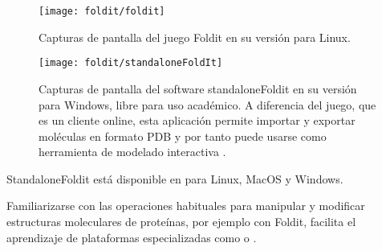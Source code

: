 \begin{figure}
\begin{center} 
\texttt{[image: foldit/foldit]}
\caption%
{
Capturas de pantalla del juego Foldit en su versi\'{o}n para Linux.
}
\label{fig:foldit}
\end{center}
\end{figure}

\begin{figure}
\begin{center} 
\texttt{[image: foldit/standaloneFoldIt]}
\caption%
{
Capturas de pantalla del software standaloneFoldit en su versi\'{o}n para Windows, libre para 
uso acad\'{e}mico. A diferencia del juego, que es un cliente online, 
esta aplicaci\'{o}n permite importar y exportar mol\'{e}culas en formato PDB y por tanto puede usarse 
como herramienta de modelado interactiva \citep{Kleffner2017}. 
}
\label{fig:standalonefoldit}
\end{center}
\end{figure}

StandaloneFoldit est\'{a} disponible en
 para Linux, MacOS y Windows. 

Familiarizarse con las operaciones habituales para manipular y modificar estructuras moleculares de prote\'{i}nas,
por ejemplo con Foldit, facilita el aprendizaje de plataformas especializadas como 
 o .
